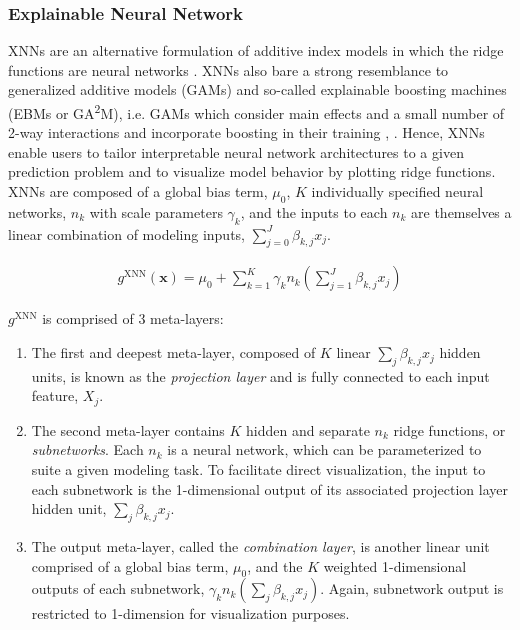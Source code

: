 \documentclass[information,article,submit,moreauthors,pdftex]{definitions/mdpi}
\begin{document}
\subsubsection{Explainable Neural Network}

XNNs are an alternative formulation of additive index models in which the ridge functions are neural networks \cite{wf_xnn}. XNNs also bare a strong resemblance to generalized additive models (GAMs) and so-called explainable boosting machines (EBMs or GA\textsuperscript{2}M), i.e. GAMs which consider main effects and a small number of 2-way interactions and incorporate boosting in their training \cite{esl}, \cite{ga2m}.  Hence, XNNs enable users to tailor interpretable neural network architectures to a given prediction problem and to visualize model behavior by plotting ridge functions. XNNs are composed of a global bias term, $\mu_0$, $K$ individually specified neural networks, $n_k$ with scale parameters $\gamma_k$, and the inputs to each $n_k$ are themselves a linear combination of modeling inputs, $\sum^J_{j=0}\beta_{k, j}x_j$.

\begin{equation}
\begin{aligned}
\label{eq:xnn}
g^{\text{XNN}}(\mathbf{x}) = \mu_0 + \sum_{k=1}^K\gamma_k n_k(\sum^J_{j=1}\beta_{k, j}x_j)
\end{aligned}
\end{equation}

\noindent $g^{\text{XNN}}$ is comprised of 3 meta-layers:

\begin{enumerate}
\item The first and deepest meta-layer, composed of $K$ linear $\sum_j\beta_{k,j}x_j$ hidden units, is known as the \textit{projection layer} and is fully connected to each input feature, $X_j$.
\item The second meta-layer contains $K$ hidden and separate $n_k$ ridge functions, or \textit{subnetworks}. Each $n_k$ is a neural network, which can be parameterized to suite a given modeling task. To facilitate direct visualization, the input to each subnetwork is the 1-dimensional output of its associated projection layer hidden unit, $\sum_j\beta_{k,j}x_j$.
\item The output meta-layer, called the \textit{combination layer}, is another linear unit comprised of a global bias term, $\mu_0$, and the $K$ weighted 1-dimensional outputs of each subnetwork, $\gamma_kn_k(\sum_j\beta_{k,j}x_j)$. Again, subnetwork output is restricted to 1-dimension for visualization purposes.
\end{enumerate}
\end{document}
